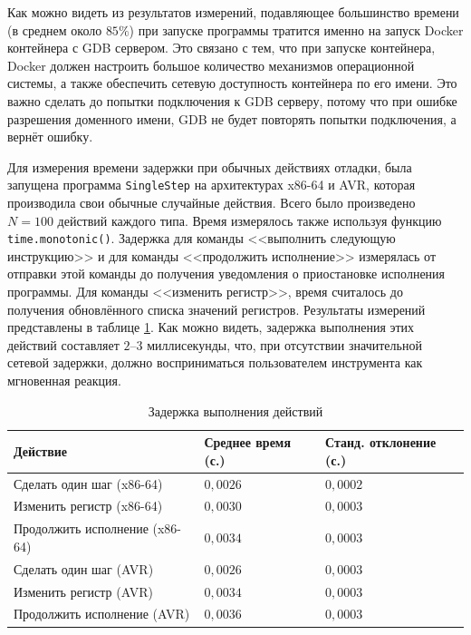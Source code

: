 \documentclass[a4paper,article,14pt]{extarticle}
\begin{document}
Как можно видеть из результатов измерений, подавляющее большинство времени (в среднем около $85\%$) при запуске программы тратится именно на запуск Docker контейнера с GDB сервером. Это связано с тем, что при запуске контейнера, Docker должен настроить большое количество механизмов операционной системы, а также обеспечить сетевую доступность контейнера по его имени. Это важно сделать до попытки подключения к GDB серверу, потому что при ошибке разрешения доменного имени, GDB не будет повторять попытки подключения, а вернёт ошибку.

Для измерения времени задержки при обычных действиях отладки, была запущена программа \texttt{SingleStep} на архитектурах x86-64 и AVR, которая производила свои обычные случайные действия. Всего было произведено $N = 100$ действий каждого типа. Время измерялось также используя функцию \texttt{time.monotonic()}. Задержка для команды <<выполнить следующую инструкцию>> и для команды <<продолжить исполнение>> измерялась от отправки этой команды до получения уведомления о приостановке исполнения программы. Для команды <<изменить регистр>>, время считалось до получения обновлённого списка значений регистров. Результаты измерений представлены в таблице \ref{table:actiondelay}. Как можно видеть, задержка выполнения этих действий составляет $2$--$3$ миллисекунды, что, при отсутствии значительной сетевой задержки, должно восприниматься пользователем инструмента как мгновенная реакция.

\begin{table}[ht]
\small
    \begin{tabular}{p{6cm}p{4.5cm}p{4.5cm}}
    \toprule
    Действие & Среднее время (с.)  & Станд. отклонение (с.) \\
    \midrule
Сделать один шаг (x86-64) & $0{,}0026$ & $0{,}0002$ \\
Изменить регистр (x86-64) & $0{,}0030$ & $0{,}0003$ \\
Продолжить исполнение (x86-64) & $0{,}0034$ & $0{,}0003$ \\
Сделать один шаг (AVR) & $0{,}0026$ & $0{,}0003$ \\
Изменить регистр (AVR) & $0{,}0034$ & $0{,}0003$ \\
Продолжить исполнение (AVR) & $0{,}0036$ & $0{,}0003$ \\
\bottomrule
    \end{tabular}
\caption{\label{table:actiondelay}Задержка выполнения действий}
\normalsize
\end{table}
\end{document}
